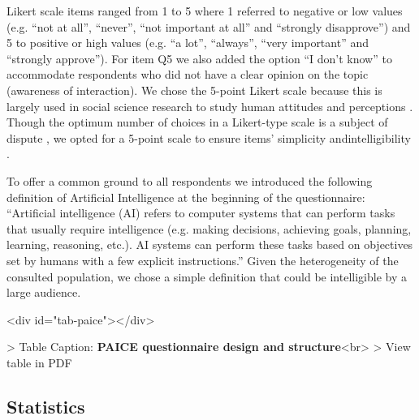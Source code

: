 \documentclass{article}
\begin{document}
Likert scale items ranged from 1 to 5 where 1 referred to negative or low values (e.g. ``not at all'', ``never'', ``not important at all'' and ``strongly disapprove'') and 5 to positive or high values (e.g. ``a lot'', ``always'', ``very important'' and ``strongly approve''). For item Q5 we also added the option ``I don't know'' to accommodate respondents who did not have a clear opinion on the topic (awareness of interaction). 
We chose the 5-point Likert scale because this is largely used in social science research to study human attitudes and perceptions \cite{nunnally1994}. Though the optimum number of choices in a Likert-type scale is a subject of dispute \cite{joshi2015}, we opted for a 5-point scale to ensure items' simplicity andintelligibility \cite{Likert, Biasutti2017}. 

To offer a common ground to all respondents we introduced the following definition of Artificial Intelligence at the beginning of the questionnaire: ``Artificial intelligence (AI) refers to computer systems that can perform tasks that usually require intelligence (e.g. making decisions, achieving goals, planning, learning, reasoning, etc.). AI systems can perform these tasks based on objectives set by humans with a few explicit instructions.'' Given the heterogeneity of the consulted population, we chose a simple definition that could be intelligible by a large audience.


\begin{table}<div id="tab-paice"></div>

> Table Caption: {\bf PAICE questionnaire design and structure}<br>
> View table in PDF
\end{table}


\subsection{Statistics}
\end{document}
